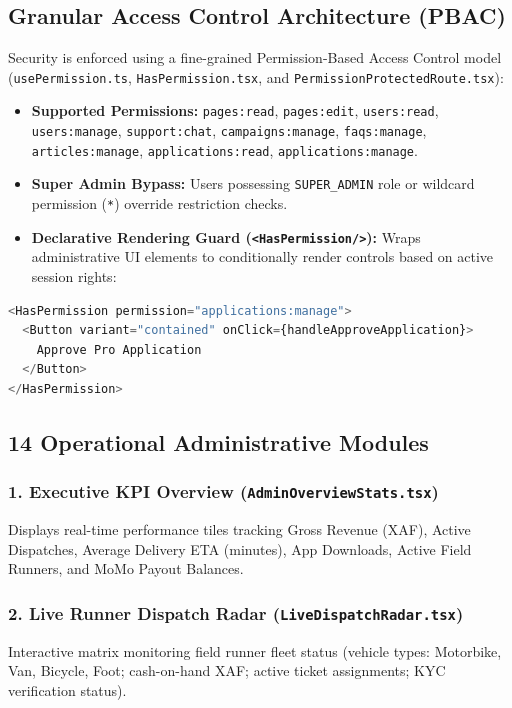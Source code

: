 \documentclass[11pt,a4paper]{article}
\begin{document}
\subsection{Granular Access Control Architecture (PBAC)}
Security is enforced using a fine-grained Permission-Based Access Control model (\texttt{usePermission.ts}, \texttt{HasPermission.tsx}, and \texttt{PermissionProtectedRoute.tsx}):
\begin{itemize}
    \item \textbf{Supported Permissions:} \texttt{pages:read}, \texttt{pages:edit}, \texttt{users:read}, \texttt{users:manage}, \texttt{support:chat}, \texttt{campaigns:manage}, \texttt{faqs:manage}, \texttt{articles:manage}, \texttt{applications:read}, \texttt{applications:manage}.
    \item \textbf{Super Admin Bypass:} Users possessing \texttt{SUPER\_ADMIN} role or wildcard permission (\texttt{*}) override restriction checks.
    \item \textbf{Declarative Rendering Guard (\texttt{<HasPermission/>}):} Wraps administrative UI elements to conditionally render controls based on active session rights:
\end{itemize}

\begin{lstlisting}[language=TypeScript, caption={Declarative Permission Component Usage}]
<HasPermission permission="applications:manage">
  <Button variant="contained" onClick={handleApproveApplication}>
    Approve Pro Application
  </Button>
</HasPermission>
\end{lstlisting}

\subsection{14 Operational Administrative Modules}

\subsubsection{1. Executive KPI Overview (\texttt{AdminOverviewStats.tsx})}
Displays real-time performance tiles tracking Gross Revenue (XAF), Active Dispatches, Average Delivery ETA (minutes), App Downloads, Active Field Runners, and MoMo Payout Balances.

\subsubsection{2. Live Runner Dispatch Radar (\texttt{LiveDispatchRadar.tsx})}
Interactive matrix monitoring field runner fleet status (vehicle types: Motorbike, Van, Bicycle, Foot; cash-on-hand XAF; active ticket assignments; KYC verification status).
\end{document}

